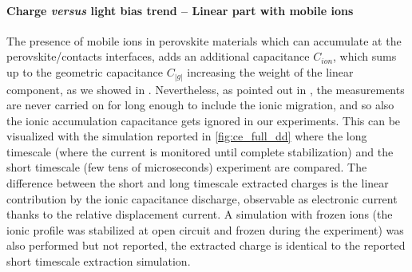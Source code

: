 					\begin{figure}
		\end{figure}

		\paragraph{Charge \textit{versus} light bias trend -- Linear part with mobile ions}
		The presence of mobile ions in perovskite materials which can accumulate at the perovskite/contacts interfaces, adds an additional capacitance $C_{ion}$, which sums up to the geometric capacitance $C_|g|$ increasing the weight of the linear component, as we showed in .
		Nevertheless, as pointed out in , the  measurements are never carried on for long enough to include the ionic migration, and so also the ionic accumulation capacitance gets ignored in our experiments.
		This can be visualized with the simulation reported in \cref{fig:ce_full_dd} where the long timescale (where the current is monitored until complete stabilization) and the short timescale (few tens of microseconds)  experiment are compared.
		The difference between the short and long timescale extracted charges is the linear contribution by the ionic capacitance discharge, observable as electronic current thanks to the relative displacement current.
		A simulation with frozen ions (the ionic profile was stabilized at open circuit and frozen during the  experiment) was also performed but not reported, the extracted charge is identical to the reported short timescale extraction simulation.
		
